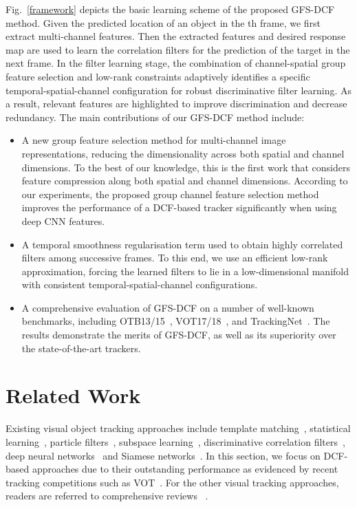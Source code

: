 \documentclass[10pt,twocolumn,letterpaper]{article}
\begin{document}
Fig.~\ref{framework} depicts the basic learning scheme of the proposed GFS-DCF method.
Given the predicted location of an object in the th frame, we first extract multi-channel features.
Then the extracted features and desired response map are used to learn the correlation filters for the prediction of the target in the next frame. In the filter learning stage, the combination of channel-spatial group feature selection and low-rank constraints adaptively identifies a specific temporal-spatial-channel configuration for robust discriminative filter learning.
As a result, relevant features are highlighted to improve discrimination and decrease redundancy. The main contributions of our GFS-DCF method include:
\begin{itemize}
\item A new group feature selection method for multi-channel image representations, reducing the dimensionality across both spatial and channel dimensions. To the best of our knowledge, this is the first work that considers feature compression along both spatial and channel dimensions.
According to our experiments, the proposed group channel feature selection method improves the performance of a DCF-based tracker significantly when using deep CNN features.
\item A temporal smoothness regularisation term used to obtain highly correlated filters among successive frames. To this end, we use an efficient low-rank approximation, forcing the learned filters to lie in a low-dimensional manifold with consistent temporal-spatial-channel configurations. 
\item A comprehensive evaluation of GFS-DCF on a number of well-known benchmarks, including OTB13/15~\cite{Wu2013Online,Wu2015Object}, VOT17/18~\cite{Kristan2017a,Kristan2018a}, and TrackingNet~\cite{muller2018trackingnet}.
The results demonstrate the merits of GFS-DCF, as well as its superiority over the state-of-the-art trackers. 
\end{itemize}



\section{Related Work}
Existing visual object tracking approaches include template matching~\cite{Lucas1981An}, statistical learning~\cite{avidan2004support}, particle filters~\cite{arulampalam2002tutorial}, subspace learning~\cite{ross2008incremental}, discriminative correlation filters~\cite{Henriques2015High}, deep neural networks~\cite{qi2016hedged} and Siamese networks~\cite{zhu2018distractor,wang2018learning,li2018high}. 
In this section, we focus on DCF-based approaches due to their outstanding performance as evidenced by recent tracking competitions such as VOT~\cite{Kristan2016The, Kristan2018a}.
For the other visual tracking approaches, readers are referred to comprehensive reviews~\cite{Smeulders2014Visual,Wu2015Object,Kristan2016The,Li2016NUS} .
\end{document}
